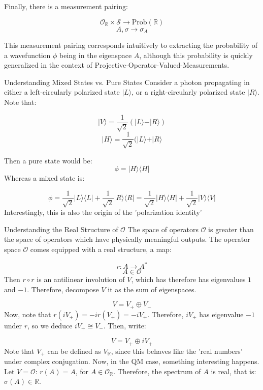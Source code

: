 \documentclass{amsart}
\begin{document}
Finally, there is a measurement pairing:

$$\mathcal{O}_{\mathbb{R}} \times \mathcal{S} \to \text{Prob}(\mathbb{R})$$
$$A, \sigma \to \sigma_{A}$$

This measurement pairing corresponds intuitively to extracting the probability of a wavefunction $\phi$ being in the eigenspace $A$, although this probability is quickly generalized in the context of Projective-Operator-Valued-Measurements. 

\begin{example}{Understanding Mixed States vs. Pure States}
Consider a photon propagating in either a left-circularly polarized state $\vert L \rangle$, or a right-circularly polarized state $\vert R \rangle$.
Note that:

$$\vert V \rangle = \frac{1}{\sqrt{2}} (\vert L \rangle - \vert R \rangle) $$
$$\vert H \rangle = \frac{1}{\sqrt{2}} (\vert L \rangle + \vert R \rangle $$

Then a pure state would be:
$$\phi = \vert H \rangle \langle H \vert$$
Whereas a mixed state is:

$$\phi = \frac{1}{\sqrt{2}} \vert L \rangle \langle L \vert + \frac{1}{\sqrt{2}} \vert R \rangle \langle R \vert = \frac{1}{\sqrt{2}} \vert H \rangle \langle H \vert + \frac{1}{\sqrt{2}} \vert V \rangle \langle V \vert$$
Interestingly, this is also the origin of the 'polarization identity'
\end{example}

\begin{example}{Understanding the Real Structure of $\mathcal{O}$}
The space of operators $\mathcal{O}$ is greater than the space of operators which have physically meaningful outputs. The operator space $\mathcal{O}$ comes equipped with a real structure, a map:

$$r: A \to A^{*}$$
$$A \in \mathcal{O}$$
Then $r \circ r$ is an antilinear involution of $V$, which has therefore has eigenvalues $1$ and $-1$. Therefore, decompose $V$ it as the sum of eigenspaces.

$$V = V_{+} \oplus V_{-} $$
Now, note that $r(i V_{+}) = -i r(V_{+}) = - iV_{+}$. Therefore, $iV_{+}$ has eigenvalue $-1$ under $r$, so we deduce $iV_{+} \cong V_{-}$. Then, write:

$$V = V_{+} \oplus i V_{+}$$
Note that $V_{+}$ can be defined as $V_{\mathbb{R}}$, since this behaves like the 'real numbers' under complex conjugation. Now, in the QM case, something interesting happens. Let $V = \mathcal{O}$: $r(A) = A$, for $A \in \mathcal{O}_{\mathbb{R}}$. Therefore, the spectrum of $A$ is real, that is: $\sigma(A) \in \mathbb{R}$. 
\end{example}
\end{document}
